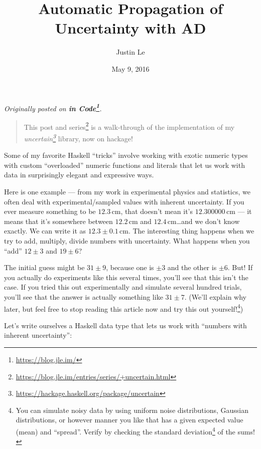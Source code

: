 \documentclass[]{article}
\title{Automatic Propagation of Uncertainty with AD}
\author{Justin Le}
\date{May 9, 2016}
\renewcommand{\href}[2]{#2\footnote{\url{#1}}}
\begin{document}
\maketitle

\emph{Originally posted on \textbf{\href{https://blog.jle.im/}{in
Code}}.}

\begin{quote}
This post and
\href{https://blog.jle.im/entries/series/+uncertain.html}{series} is a
walk-through of the implementation of my
\emph{\href{https://hackage.haskell.org/package/uncertain}{uncertain}}
library, now on hackage!
\end{quote}

Some of my favorite Haskell ``tricks'' involve working with exotic
numeric types with custom ``overloaded'' numeric functions and literals
that let us work with data in surprisingly elegant and expressive ways.

Here is one example --- from my work in experimental physics and
statistics, we often deal with experimental/sampled values with inherent
uncertainty. If you ever measure something to be \(12.3\,\mathrm{cm}\),
that doesn't mean it's \(12.300000\,\mathrm{cm}\) --- it means that it's
somewhere between \(12.2\,\mathrm{cm}\) and
\(12.4\,\mathrm{cm}\)\ldots{}and we don't know exactly. We can write it
as \(12.3 \pm 0.1\,\mathrm{cm}\). The interesting thing happens when we
try to add, multiply, divide numbers with uncertainty. What happens when
you ``add'' \(12 \pm 3\) and \(19 \pm 6\)?

The initial guess might be \(31 \pm 9\), because one is \(\pm 3\) and
the other is \(\pm 6\). But! If you actually do experiments like this
several times, you'll see that this isn't the case. If you tried this
out experimentally and simulate several hundred trials, you'll see that
the answer is actually something like \(31 \pm 7\). (We'll explain why
later, but feel free to stop reading this article now and try this out
yourself!\footnote{You can simulate noisy data by using uniform noise
  distributions, Gaussian distributions, or however manner you like that
  has a given expected value (mean) and ``spread''. Verify by checking
  the \href{https://en.wikipedia.org/wiki/Standard_deviation}{standard
  deviation} of the sums!})

Let's write ourselves a Haskell data type that lets us work with
``numbers with inherent uncertainty'':
\end{document}
